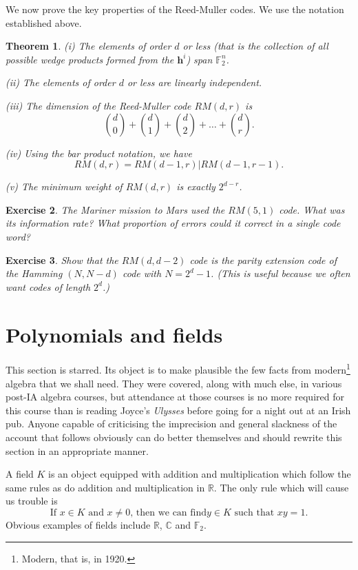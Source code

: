 \documentclass[12pt,a4paper]{article}
\theoremstyle{plain}
\newtheorem{theorem}{Theorem}[section]
\newtheorem{exercise}[theorem]{Exercise}
\theoremstyle{definition}
\begin{document}
We now prove the key properties of the Reed-Muller
codes. We use the notation established above.
\begin{theorem}\label{theorem Reed}
(i) The elements of order $d$
or less (that is the collection of all possible wedge products
formed from the ${\mathbf h}^{i}$) span
${\mathbb F}^{n}_{2}$.

(ii) The elements of order $d$
or less are linearly independent.

(iii) The dimension of the Reed-Muller code $RM(d,r)$
is
\[\binom{d}{0}+\binom{d}{1}+\binom{d}{2}
+\dots+\binom{d}{r}.\]

(iv) Using the bar product notation, we
have
\[RM(d,r)=RM(d-1,r)|RM(d-1,r-1).\]

(v) The minimum weight of $RM(d,r)$ is exactly
$2^{d-r}$.
\end{theorem}
\begin{exercise} The Mariner mission to Mars used
the $RM(5,1)$ code. What was its information
rate? What proportion of errors could it correct
in a single code word?
\end{exercise}
\begin{exercise} Show that the $RM(d,d-2)$ code is the
parity extension code of the Hamming $(N,N-d)$ code
with $N=2^{d}-1$. (This is useful because we often
want codes of length $2^{d}$.)
\end{exercise}
\section{Polynomials and fields} This section is
starred. Its
object is to make plausible the few facts from
modern\footnote{Modern, that is, in 1920.} algebra
that we shall need. They were covered, along with
much else, in various post-IA algebra courses,
but attendance at those courses is no more
required for this course than is reading Joyce's
\emph{Ulysses} before going for a night out at
an Irish pub. Anyone capable of criticising
the imprecision and general slackness of the
account that follows obviously can do better
themselves and should rewrite this section in an appropriate
manner.

A field $K$ is an object equipped with addition
and multiplication which follow the same rules
as do addition and multiplication in ${\mathbb R}$.
The only rule which will cause us trouble
is
\begin{equation*}
\text{If $x\in K$ and $x\neq 0$, then we can find
$y\in K$ such that $xy=1$.}\tag*{$\bigstar$}
\end{equation*}
Obvious examples of fields include ${\mathbb R}$, ${\mathbb C}$
and ${\mathbb F}_{2}$.
\end{document}
